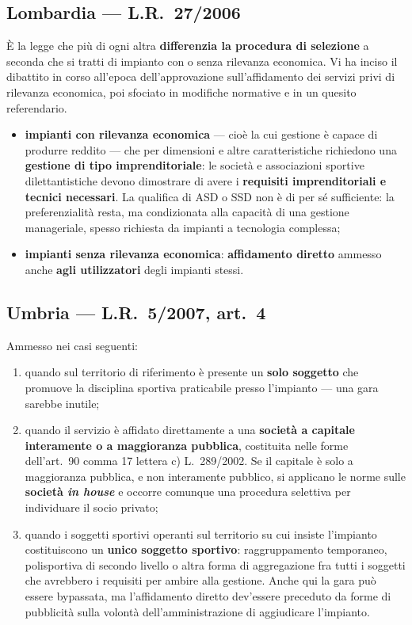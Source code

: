 \subsection{Lombardia --- L.R.\ 27/2006}

È la legge che più di ogni altra \textbf{differenzia la procedura di selezione} a seconda che si
tratti di impianto con o senza rilevanza economica. Vi ha inciso il dibattito in corso all'epoca
dell'approvazione sull'affidamento dei servizi privi di rilevanza economica, poi sfociato in
modifiche normative e in un quesito referendario.

\begin{itemize}
  \item \textbf{impianti con rilevanza economica} --- cioè la cui gestione è capace di produrre
    reddito --- che per dimensioni e altre caratteristiche richiedono una \textbf{gestione di tipo
    imprenditoriale}: le società e associazioni sportive dilettantistiche devono dimostrare di
    avere i \textbf{requisiti imprenditoriali e tecnici necessari}. La qualifica di ASD o SSD non è
    di per sé sufficiente: la preferenzialità resta, ma condizionata alla capacità di una gestione
    manageriale, spesso richiesta da impianti a tecnologia complessa;
  \item \textbf{impianti senza rilevanza economica}: \textbf{affidamento diretto} ammesso anche
    \textbf{agli utilizzatori} degli impianti stessi.
\end{itemize}

\subsection{Umbria --- L.R.\ 5/2007, art.\ 4}


Ammesso nei casi seguenti:

\begin{enumerate}
  \item[a)] quando sul territorio di riferimento è presente un \textbf{solo soggetto} che promuove
    la disciplina sportiva praticabile presso l'impianto --- una gara sarebbe inutile;
  \item[b)] quando il servizio è affidato direttamente a una \textbf{società a capitale interamente
    o a maggioranza pubblica}, costituita nelle forme dell'art.\ 90 comma 17 lettera c) L.\
    289/2002. Se il capitale è solo a maggioranza pubblica, e non interamente pubblico, si
    applicano le norme sulle \textbf{società \textit{in house}} e occorre comunque una procedura
    selettiva per individuare il socio privato;
  \item[c)] quando i soggetti sportivi operanti sul territorio su cui insiste l'impianto
    costituiscono un \textbf{unico soggetto sportivo}: raggruppamento temporaneo, polisportiva di
    secondo livello o altra forma di aggregazione fra tutti i soggetti che avrebbero i requisiti
    per ambire alla gestione. Anche qui la gara può essere bypassata, ma l'affidamento diretto
    dev'essere preceduto da forme di pubblicità sulla volontà dell'amministrazione di aggiudicare
    l'impianto.
\end{enumerate}

